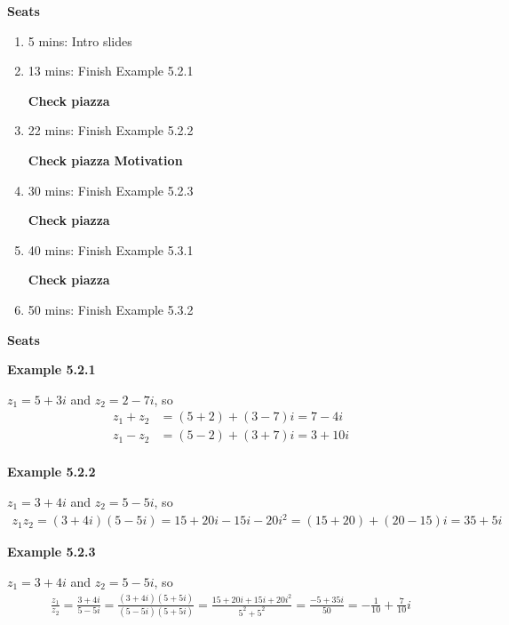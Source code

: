 \textbf{Seats}
\begin{enumerate}
    \item 5 mins: Intro slides \par
    \item 13 mins: Finish Example 5.2.1 \par
    \textbf{Check piazza}
    \item 22 mins: Finish Example 5.2.2 \par
    \textbf{Check piazza}
    \textbf{Motivation}
    \item 30 mins: Finish Example 5.2.3 \par
    \textbf{Check piazza}
    \item 40 mins: Finish Example 5.3.1 \par
    \textbf{Check piazza}
    \item 50 mins: Finish Example 5.3.2 \par
\end{enumerate}
\textbf{Seats}

\newcommand{\vect}[1]{\underline{\mathbf{#1}}}

\vspace{5mm} 

\textbf{Example 5.2.1} \par

$z_1 = 5+3i$ and $z_2 = 2-7i$, so
\begin{align*}
z_1 + z_2 &= (5+2) + (3-7)i = 7 - 4i\\
z_1 - z_2 &= (5-2) + (3+7)i = 3 + 10i\\
\end{align*}

\vspace{5mm} 
\textbf{Example 5.2.2} \par

$z_1 = 3+4i$ and $z_2 = 5-5i$, so
\begin{align*}
z_1z_2 = (3+4i)(5-5i) = 15 + 20i - 15i - 20i^2 = (15+20) + (20-15)i = 35 + 5i
\end{align*}

\vspace{5mm} 
\textbf{Example 5.2.3} \par

$z_1 = 3+4i$ and $z_2 = 5-5i$, so
\begin{align*}
\frac{z_1}{z_2} = \frac{3+4i}{5-5i} = \frac{(3+4i)(5+5i)}{(5-5i)(5+5i)} = \frac{15 + 20i + 15i + 20i^2}{5^2 + 5^2} = \frac{-5 +35i}{50} = -\frac{1}{10} + \frac{7}{10}i
\end{align*}

